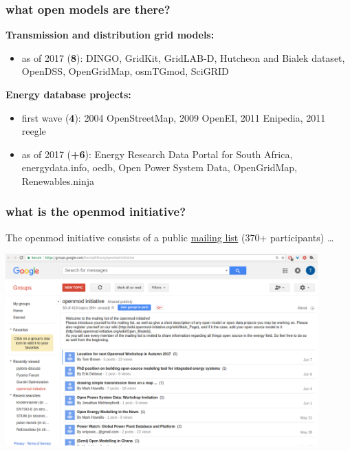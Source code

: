 \documentclass[12pt,aspectratio=169]{beamer}
\let\olditem\item
\renewcommand{\item}{%
\olditem\vspace{5pt}}
\begin{document}
\begin{frame}
  \frametitle{what open models are there?}

  {\bf Transmission and distribution grid models:}
  \begin{itemize}
    \item as of 2017 ({\bf 8}): DINGO, GridKit, GridLAB-D, Hutcheon and Bialek dataset,
  OpenDSS, OpenGridMap, osmTGmod, SciGRID
  \end{itemize}

  {\bf Energy database projects:}
  \begin{itemize}
  \item first wave ({\bf 4}): 2004 OpenStreetMap, 2009 OpenEI, 2011 Enipedia, 2011 reegle
  \item as of 2017 ({\bf +6}): Energy Research Data Portal for South Africa, energydata.info,
  oedb, Open Power System Data, OpenGridMap, Renewables.ninja
  \end{itemize}

\end{frame}


\begin{frame}
  \frametitle{what is the openmod initiative?}

  The openmod initiative consists of a public \alert{\href{https://groups.google.com/forum/\#!forum/openmod-initiative}{mailing list}} (370+ participants) \dots

  \centering
  \includegraphics[width=12cm]{openmod-mailing_list}

\end{frame}
\end{document}
